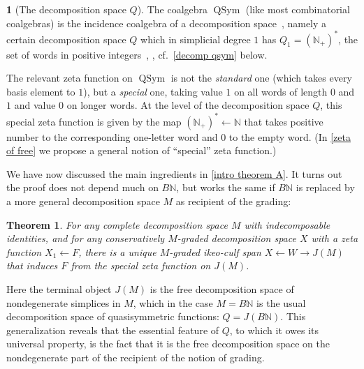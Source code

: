 \documentclass{amsart}
\newcommand{\QSym}{\operatorname{QSym}}
\newcommand{\N}{\mathbb{N}}
\newtheorem{letterthm}{Theorem}\renewcommand{\theletterthm}{\Alph{letterthm}}
\theoremstyle{definition}
\theoremstyle{noname}
\newtheorem{blanko}[theorem]{}
\begin{document}
\begin{blanko}[The decomposition space $Q$]
  The coalgebra $\QSym$ (like most combinatorial coalgebras) is the
  incidence coalgebra of a decomposition space~\cite{GKT1}, namely a
  certain decomposition space $Q$ which in simplicial degree $1$ has 
  $Q_1 = (\N_+)^*$, the
  set of words in positive integers~\cite{GKT:QSym},
  \cite{Hackney-Kock:2210.11192}, cf.~\ref{decomp qsym} below. 

The relevant zeta function on $\QSym$ is not the \emph{standard}
one (which takes every basis element to $1$), but a \emph{special} one,
taking value $1$ on all words of length $0$ and $1$ and value $0$ on longer
words. At the level of the decomposition space $Q$, this special zeta
function is given by the map $(\N_+)^*\leftarrow \N$ that takes positive
number to the corresponding one-letter word and $0$ to the empty word. (In
\ref{zeta of free} we propose a general notion of ``special'' zeta function.)

\end{blanko}


We have now discussed the main ingredients in \cref{intro theorem A}. It turns out the 
proof does not depend much on $B\N$, but works the same 
if $B\N$ is replaced by a more general decomposition space $M$ as 
recipient of the grading:





\begin{letterthm}\label{intro theorem B}
  For any complete decomposition space $M$ with indecomposable identities,
  and for any conservatively $M$-graded decomposition space $X$ with a zeta
  function $X_1 \leftarrow F$, there is a unique $M$-graded ikeo-culf span $X
  \leftarrow W \to J(M)$ that induces $F$ from the special zeta function on
  $J(M)$.
\end{letterthm}


Here the terminal object $J(M)$ is the free decomposition space of nondegenerate simplices in $M$,
which in the case $M=B\N$ is the usual decomposition space of quasisymmetric
functions: $Q = J(B\N)$. 
  This generalization reveals that the essential feature of $Q$, to which it
  owes its universal property, is the fact that it is the free decomposition
  space on the nondegenerate part of the recipient of the notion of grading.
\end{document}
